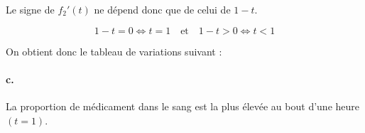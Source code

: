 \documentclass[10pt]{article}
\providecommand{\e}{{\mathrm{e}}}
\begin{document}
Le signe de \( f_2'(t) \) ne dépend donc que de celui de \( 1 - t \).

\[
1 - t = 0 \iff t = 1 \quad \text{et} \quad 1 - t > 0 \iff t < 1
\]

On obtient donc le tableau de variations suivant :

\begin{center}
\end{center}

\paragraph{c.} La proportion de médicament dans le sang est la plus élevée au bout d'une heure \((t = 1)\).
\end{document}
